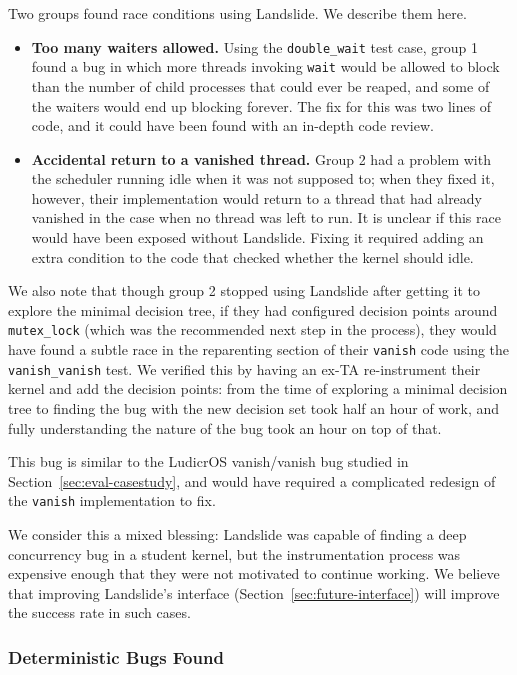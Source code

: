 Two groups found race conditions using Landslide. We describe them here.

\begin{itemize}
	\item {\bf Too many waiters allowed.} Using the \texttt{double\_wait} test case, group 1 found a bug in which more threads invoking \texttt{wait} would be allowed to block than the number of child processes that could ever be reaped, and some of the waiters would end up blocking forever. The fix for this was two lines of code, and it could have been found with an in-depth code review.
	\item {\bf Accidental return to a vanished thread.} Group 2 had a problem with the scheduler running idle when it was not supposed to; when they fixed it, however, their implementation would return to a thread that had already vanished in the case when no thread was left to run. It is unclear if this race would have been exposed without Landslide. Fixing it required adding an extra condition to the code that checked whether the kernel should idle.
\end{itemize}

We also note that though group 2 stopped using Landslide after getting it to explore the minimal decision tree, if they had configured decision points around \texttt{mutex\_lock} (which was the recommended next step in the process), they would have found a subtle race in the reparenting section of their \texttt{vanish} code using the \texttt{vanish\_vanish} test. We verified this by having an ex-TA re-instrument their kernel and add the decision points: from the time of exploring a minimal decision tree to finding the bug with the new decision set took half an hour of work, and fully understanding the nature of the bug took an hour on top of that.

This bug is similar to the LudicrOS vanish/vanish bug studied in Section~\ref{sec:eval-casestudy}, and would have required a complicated redesign of the \texttt{vanish} implementation to fix.

We consider this a mixed blessing: Landslide was capable of finding a deep concurrency bug in a student kernel, but the instrumentation process was expensive enough that they were not motivated to continue working. We believe that improving Landslide's interface (Section~\ref{sec:future-interface}) will improve the success rate in such cases.

\subsubsection{Deterministic Bugs Found}

